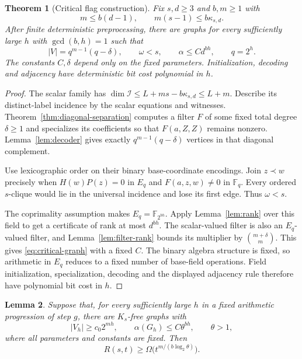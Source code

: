\documentclass[11pt,a4paper]{article}
\newcommand{\F}{\mathbb F}
\newcommand{\Ical}{\mathcal I}
\newtheorem{theorem}{Theorem}[section]
\newtheorem{lemma}[theorem]{Lemma}
\theoremstyle{definition}
\theoremstyle{remark}
\numberwithin{equation}{section}
\begin{document}
\begin{theorem}[Critical flag construction]\label{thm:critical}
Fix $s,d\ge3$ and $b,m\ge1$ with
\begin{equation}\label{eq:endpoint-condition}
m\le b(d-1),\qquad m(s-1)\le b\kappa_{s,d}.
\end{equation}
After finite deterministic preprocessing, there are graphs for every sufficiently large $h$ with $\gcd(b,h)=1$ such that
\begin{equation}\label{eq:critical-graph}
|V|=q^{m-1}(q-\delta),\qquad\omega<s,\qquad\alpha\le C d^{bh},\qquad q=2^h.
\end{equation}
The constants $C,\delta$ depend only on the fixed parameters. Initialization, decoding and adjacency have deterministic bit cost polynomial in $h$.
\end{theorem}

\begin{proof}
The scalar family has $\dim\Ical\le L+ms-b\kappa_{s,d}\le L+m$. Describe its distinct-label incidence by the scalar equations and witnesses. Theorem~\ref{thm:diagonal-separation} computes a filter $F$ of some fixed total degree $\delta\ge1$ and specializes its coefficients so that $F(a,Z,Z)$ remains nonzero. Lemma~\ref{lem:decoder} gives exactly $q^{m-1}(q-\delta)$ vertices in that diagonal complement.

Use lexicographic order on their binary base-coordinate encodings. Join $z\prec w$ precisely when $H(w)P(z)=0$ in $E_q$ and $F(a,z,w)\ne0$ in $\F_q$. Every ordered $s$-clique would lie in the universal incidence and lose its first edge. Thus $\omega<s$.

The coprimality assumption makes $E_q=\F_{2^{bh}}$. Apply Lemma~\ref{lem:rank} over this field to get a certificate of rank at most $d^{bh}$. The scalar-valued filter is also an $E_q$-valued filter, and Lemma~\ref{lem:filter-rank} bounds its multiplier by $\binom{m+\delta}{m}$. This gives \eqref{eq:critical-graph} with a fixed $C$. The binary algebra structure is fixed, so arithmetic in $E_q$ reduces to a fixed number of base-field operations. Field initialization, specialization, decoding and the displayed adjacency rule therefore have polynomial bit cost in $h$.
\end{proof}

\begin{lemma}\label{lem:extraction}
Suppose that, for every sufficiently large $h$ in a fixed arithmetic progression of step $g$, there are $K_s$-free graphs with
\[
|V_h|\ge c_0 2^{mh},\qquad\alpha(G_h)\le C\theta^{bh},\qquad\theta>1,
\]
where all parameters and constants are fixed. Then
\begin{equation}\label{eq:bounded-gap-extraction}
R(s,t)\ge\Omega\bigl(t^{m/(b\log_2\theta)}\bigr).
\end{equation}
\end{lemma}
\end{document}
